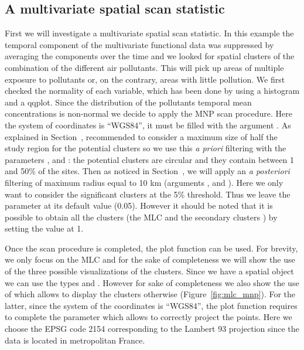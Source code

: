 \subsection{A multivariate spatial scan statistic} \label{subsec:resmulti}

First we will investigate a multivariate spatial scan statistic. In this example the temporal component of the multivariate functional data was suppressed by averaging the components over the time and we looked for spatial clusters of the combination of the different air pollutants. This will pick
up areas of multiple exposure to pollutants or, on the contrary, areas with little pollution. We first checked the normality of each variable, which has been done by using a histogram and a qqplot.
Since the distribution of the pollutants temporal mean concentrations is non-normal we decide to apply the MNP scan procedure. Here the system of coordinates is ``WGS84'', it must be filled with the argument . As explained in Section~, \cite{spatialdisease} recommended to consider a maximum size of half the study region for the potential clusters so we use this \textit{a priori} filtering with the parameters ,  and : the potential clusters are circular and they contain between 1 and 50\% of the sites. Then as noticed in Section~, we will apply an \textit{a posteriori} filtering of maximum radius equal to 10 km (arguments ,  and ). Here we only want to consider the significant clusters at the 5\% threshold. Thus we leave the  parameter at its default value (0.05). However it should be noted that it is possible to obtain all the clusters (the MLC and the secondary clusters \citep{spatialscanstat}) by setting the  value at 1.


\noindent Once the scan procedure is completed, the plot function can be used. For brevity, we only focus on the MLC and for the sake of completeness we will show the use of the three possible visualizations of the clusters. Since we have a spatial object  we can use the types  and . However for sake of completeness we also show the use of  which allows to display the clusters otherwise (Figure~\ref{fig:mlc_mnp}). For the latter, since the system of the coordinates is ``WGS84'', the plot function requires to complete the parameter  which allows to correctly project the points. Here we choose the EPSG code 2154 corresponding to the Lambert 93 projection since the data is located in metropolitan France.

